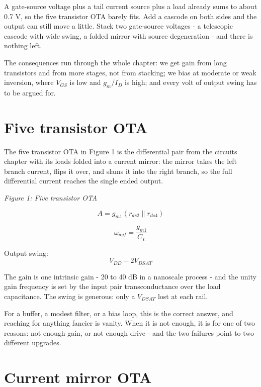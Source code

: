 A gate-source voltage plus a tail current source plus a load already
sums to about 0.7 V, so the five transistor OTA barely fits. Add a
cascode on both sides and the output can still move a little. Stack two
gate-source voltages - a telescopic cascode with wide swing, a folded
mirror with source degeneration - and there is nothing left.

The consequences run through the whole chapter: we get gain from long
transistors and from more stages, not from stacking; we bias at moderate
or weak inversion, where \(V_{GS}\) is low and \(g_m/I_D\) is high; and
every volt of output swing has to be argued for.

\section{Five transistor OTA}\label{five-transistor-ota}

The five transistor OTA in Figure 1 is the differential pair from the
circuits chapter with its loads folded into a current mirror: the mirror
takes the left branch current, flips it over, and slams it into the
right branch, so the full differential current reaches the single ended
output.


{
\centering
{}
}

\emph{Figure 1: Five transistor OTA}

\[ A = g_{m1} (r_{ds2} \parallel r_{ds4}) \]

\[ \omega_{ugf} = \frac{g_{m1}}{C_L} \]

Output swing: \[V_{DD} - 2 V_{DSAT}\]

The gain is one intrinsic gain - 20 to 40 dB in a nanoscale process -
and the unity gain frequency is set by the input pair transconductance
over the load capacitance. The swing is generous: only a \(V_{DSAT}\)
lost at each rail.

For a buffer, a modest filter, or a bias loop, this is the correct
answer, and reaching for anything fancier is vanity. When it is not
enough, it is for one of two reasons: not enough gain, or not enough
drive - and the two failures point to two different upgrades.

\section{Current mirror OTA}\label{current-mirror-ota}

